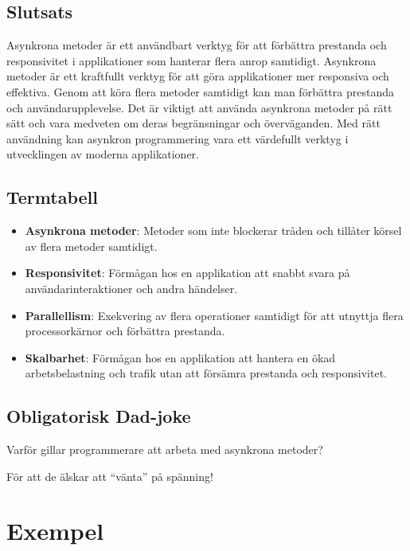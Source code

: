 \hypertarget{slutsats}{%
\subsection{Slutsats}\label{slutsats}}

Asynkrona metoder är ett användbart verktyg för att förbättra prestanda
och responsivitet i applikationer som hanterar flera anrop samtidigt.
Asynkrona metoder är ett kraftfullt verktyg för att göra applikationer
mer responsiva och effektiva. Genom att köra flera metoder samtidigt kan
man förbättra prestanda och användarupplevelse. Det är viktigt att
använda asynkrona metoder på rätt sätt och vara medveten om deras
begränsningar och överväganden. Med rätt användning kan asynkron
programmering vara ett värdefullt verktyg i utvecklingen av moderna
applikationer.

\hypertarget{termtabell}{%
\subsection{Termtabell}\label{termtabell}}

\begin{itemize}
\tightlist
\item
  \textbf{Asynkrona metoder}: Metoder som inte blockerar tråden och
  tillåter körsel av flera metoder samtidigt.
\item
  \textbf{Responsivitet}: Förmågan hos en applikation att snabbt svara
  på användarinteraktioner och andra händelser.
\item
  \textbf{Parallellism}: Exekvering av flera operationer samtidigt för
  att utnyttja flera processorkärnor och förbättra prestanda.
\item
  \textbf{Skalbarhet}: Förmågan hos en applikation att hantera en ökad
  arbetsbelastning och trafik utan att försämra prestanda och
  responsivitet.
\end{itemize}

\hypertarget{obligatorisk-dad-joke}{%
\subsection{Obligatorisk Dad-joke}\label{obligatorisk-dad-joke}}

Varför gillar programmerare att arbeta med asynkrona metoder?

För att de älskar att ``vänta'' på spänning!

\hypertarget{exempel}{%
\section{Exempel}\label{exempel}}

